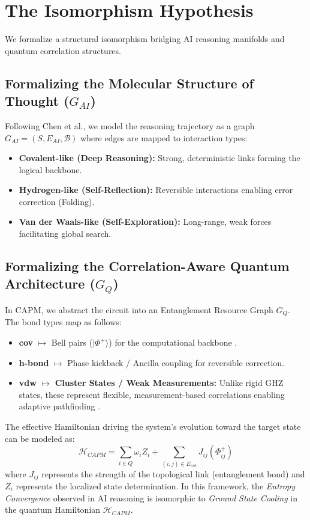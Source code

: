 \documentclass[11pt, a4paper]{article}
\begin{document}
\section{The Isomorphism Hypothesis}
\label{sec:isomorphism}

We formalize a structural isomorphism bridging AI reasoning manifolds and quantum correlation structures.

\subsection{Formalizing the Molecular Structure of Thought ($G_{AI}$)}
Following Chen et al., we model the reasoning trajectory as a graph $G_{AI} = (S, E_{AI}, \mathcal{B})$ where edges are mapped to interaction types:
\begin{itemize}
    \setlength\itemsep{0.3em}
    \item \textbf{Covalent-like (Deep Reasoning):} Strong, deterministic links forming the logical backbone.
    \item \textbf{Hydrogen-like (Self-Reflection):} Reversible interactions enabling error correction (Folding).
    \item \textbf{Van der Waals-like (Self-Exploration):} Long-range, weak forces facilitating global search.
\end{itemize}

\subsection{Formalizing the Correlation-Aware Quantum Architecture ($G_{Q}$)}
In CAPM, we abstract the circuit into an Entanglement Resource Graph $G_{Q}$. The bond types map as follows:
\begin{itemize}
    \setlength\itemsep{0.3em}
    \item \textbf{cov} $\mapsto$ Bell pairs ($|\Phi^+\rangle$) for the computational backbone \cite{nielsen2010}.
    \item \textbf{h-bond} $\mapsto$ Phase kickback / Ancilla coupling for reversible correction.
    \item \textbf{vdw} $\mapsto$ \textbf{Cluster States / Weak Measurements:} Unlike rigid GHZ states, these represent flexible, measurement-based correlations enabling adaptive pathfinding \cite{raussendorf2001}.
\end{itemize}

The effective Hamiltonian driving the system's evolution toward the target state can be modeled as:
\begin{equation}
\mathcal{H}_{CAPM} = \sum_{i \in Q} \omega_i Z_i + \sum_{(i,j) \in E_{ent}} J_{ij} (\Phi^+_{ij}) 
\end{equation}
where $J_{ij}$ represents the strength of the topological link (entanglement bond) and $Z_i$ represents the localized state determination. In this framework, the \textit{Entropy Convergence} observed in AI reasoning \cite{chen2026} is isomorphic to \textit{Ground State Cooling} in the quantum Hamiltonian $\mathcal{H}_{CAPM}$.
\end{document}
